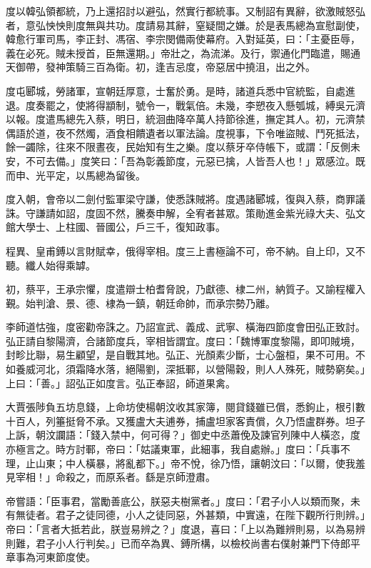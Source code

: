 \begin{pinyinscope}
 度以韓弘領都統，乃上還招討以避弘，然實行都統事。又制詔有異辭，欲激賊怒弘者，意弘怏怏則度無與共功。度請易其辭，窒疑間之嫌。於是表馬總為宣慰副使，韓愈行軍司馬，李正封、馮宿、李宗閔備兩使幕府。入對延英，曰：「主憂臣辱，義在必死。賊未授首，臣無還期。」帝壯之，為流涕。及行，禦通化門臨遣，賜通天御帶，發神策騎三百為衛。初，逢吉忌度，帝惡居中撓沮，出之外。



 度屯郾城，勞諸軍，宣朝廷厚意，士奮於勇。是時，諸道兵悉中官統監，自處進退。度奏罷之，使將得顓制，號令一，戰氣倍。未幾，李愬夜入懸瓠城，縛吳元濟以報。度遣馬總先入蔡，明日，統洄曲降卒萬人持節徐進，撫定其人。初，元濟禁偶語於道，夜不然燭，酒食相饋遺者以軍法論。度視事，下令唯盜賊、鬥死抵法，餘一蠲除，往來不限晝夜，民始知有生之樂。度以蔡牙卒侍帳下，或謂：「反側未安，不可去備。」度笑曰：「吾為彰義節度，元惡已擒，人皆吾人也！」眾感泣。既而申、光平定，以馬總為留後。



 度入朝，會帝以二劍付監軍梁守謙，使悉誅賊將。度遇諸郾城，復與入蔡，商罪議誅。守謙請如詔，度固不然，騰奏申解，全宥者甚眾。策勛進金紫光祿大夫、弘文館大學士、上柱國、晉國公，戶三千，復知政事。



 程異、皇甫鎛以言財賦幸，俄得宰相。度三上書極論不可，帝不納。自上印，又不聽。纖人始得乘罅。



 初，蔡平，王承宗懼，度遣辯士柏耆脅說，乃獻德、棣二州，納質子。又諭程權入覲。始判滄、景、德、棣為一鎮，朝廷命帥，而承宗勢乃離。



 李師道怙強，度密勸帝誅之。乃詔宣武、義成、武寧、橫海四節度會田弘正致討。弘正請自黎陽濟，合諸節度兵，宰相皆謂宜。度曰：「魏博軍度黎陽，即叩賊境，封畛比聯，易生顧望，是自戰其地。弘正、光顏素少斷，士心盤桓，果不可用。不如養威河北，須霜降水落，絕陽劉，深抵鄆，以營陽穀，則人人殊死，賊勢窮矣。」上曰：「善。」詔弘正如度言。弘正奉詔，師道果禽。



 大賈張陟負五坊息錢，上命坊使楊朝汶收其家簿，閱貸錢雖已償，悉鉤止，根引數十百人，列箠挺脅不承。又獲盧大夫逋券，捕盧坦家客責償，久乃悟盧群券。坦子上訴，朝汶讕語：「錢入禁中，何可得？」御史中丞蕭俛及諫官列陳中人橫恣，度亦極言之。時方討鄆，帝曰：「姑議東軍，此細事，我自處辦。」度曰：「兵事不理，止山東；中人橫暴，將亂都下。」帝不悅，徐乃悟，讓朝汶曰：「以爾，使我羞見宰相！」命殺之，而原系者。繇是京師澄肅。



 帝嘗語：「臣事君，當勵善底公，朕惡夫樹黨者。」度曰：「君子小人以類而聚，未有無徒者。君子之徒同德，小人之徒同惡，外甚類，中實遠，在陛下觀所行則辨。」帝曰：「言者大抵若此，朕豈易辨之？」度退，喜曰：「上以為難辨則易，以為易辨則難，君子小人行判矣。」已而卒為異、鎛所構，以檢校尚書右僕射兼門下侍郎平章事為河東節度使。




\end{pinyinscope}
